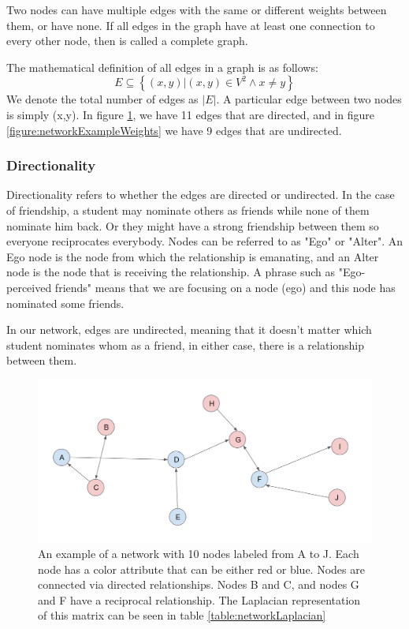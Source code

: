 Two nodes can have multiple edges with the same or different weights between them, or have none. If all edges in the graph have at least one connection to every other node, then is called a complete graph.

The mathematical definition of all edges in a graph is as follows:
    \begin{equation}
        E \subseteq  \left\{   (x,y) | (x,y) \in V^2  \land x  \neq y  \right\}
    \end{equation}
We denote the total number of edges as $|E|$. A particular edge between two nodes is simply (x,y). In figure \ref{figure:networkExampleBasic}, we have 11 edges that are directed, and in figure \ref{figure:networkExampleWeights} we have 9 edges that are undirected.

\subsubsection{Directionality}

Directionality refers to whether the edges are directed or undirected. In the case of friendship, a student may nominate others as friends while none of them nominate him back. Or they might have a strong friendship between them so everyone reciprocates everybody. Nodes can be referred to as "Ego" or "Alter". An Ego node is the node from which the relationship is emanating, and an Alter node is the node that is receiving the relationship. A phrase such as "Ego-perceived friends" means that we are focusing on a node (ego) and this node has nominated some friends.

In our network, edges are undirected, meaning that it doesn't matter which student nominates whom as a friend, in either case, there is a relationship between them.

    \begin{figure}[H]
        \centering
            \includegraphics[width=0.7\linewidth]{figures/Networks/Concepts/directed.png} 
        \caption{An example of a network with 10 nodes labeled from A to J. Each node has a color attribute that can be either red or blue. Nodes are connected via directed relationships. Nodes B and C, and nodes G and F have a reciprocal relationship. The Laplacian representation of this matrix can be seen in table \ref{table:networkLaplacian}}
        \label{figure:networkExampleBasic}
    \end{figure}

